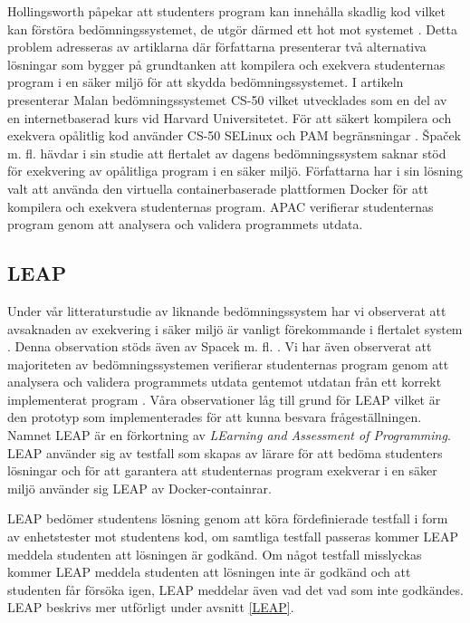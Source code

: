 \documentclass[a4paper,11pt]{article}
\begin{document}
{Hollingsworth påpekar att studenters program kan innehålla skadlig kod vilket kan förstöra bedömningssystemet, de utgör därmed ett hot mot systemet \cite{hollingsworth_2}. Detta problem adresseras av artiklarna \cite{spacek_13} \cite{cs50_8} \cite{ihantola} där författarna presenterar två alternativa lösningar som bygger på grundtanken att kompilera och exekvera studenternas program i en säker miljö för att skydda bedömningssystemet. I artikeln \cite{cs50_8} presenterar Malan bedömningssystemet CS-50 vilket utvecklades som en del av en internetbaserad kurs vid Harvard Universitetet. För att säkert kompilera och exekvera opålitlig kod använder CS-50 SELinux \cite{selinux} och PAM begränsningar \cite{pambegransningar}. Špaček m. fl. \cite{spacek_13} hävdar i sin studie att flertalet av dagens bedömningssystem saknar stöd för exekvering av opålitliga program i en säker miljö. Författarna har i sin lösning valt att använda den virtuella containerbaserade plattformen Docker \cite{docker} för att kompilera och exekvera studenternas program. APAC verifierar studenternas program genom att analysera och validera programmets utdata.

\subsection{LEAP}

Under vår litteraturstudie av liknande bedömningssystem har vi observerat att avsaknaden av exekvering i säker miljö är vanligt förekommande i flertalet system \cite{douce_11} \cite{roboprof_4} \cite{higgins_coursemarker_12}. Denna observation stöds även av Spacek m. fl. \cite{spacek_13}. Vi har även observerat att majoriteten av bedömningssystemen verifierar studenternas program genom att analysera och validera programmets utdata gentemot utdatan från ett korrekt implementerat program \cite{douce_11} \cite{caiza_7}. Våra observationer låg till grund för LEAP vilket är den prototyp som implementerades för att kunna besvara frågeställningen. Namnet LEAP är en förkortning av \textit{LEarning and Assessment of Programming}. LEAP använder sig av testfall som skapas av lärare för att bedöma studenters lösningar och för att garantera att studenternas program exekverar i en säker miljö använder sig LEAP av Docker-containrar.

LEAP bedömer studentens lösning genom att köra fördefinierade testfall i form av enhetstester mot studentens kod, om samtliga testfall passeras kommer LEAP meddela studenten att lösningen är godkänd. Om något testfall misslyckas kommer LEAP meddela studenten att lösningen inte är godkänd och att studenten får försöka igen, LEAP meddelar även vad det vad som inte godkändes. LEAP beskrivs mer utförligt under avsnitt \ref{LEAP}.


}
\end{document}
